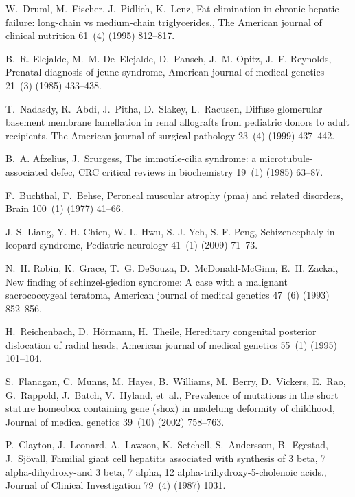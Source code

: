 \documentclass{article}
\theoremstyle{definition}
\begin{document}
\begin{thebibliography}{10}
W.~Druml, M.~Fischer, J.~Pidlich, K.~Lenz, Fat elimination in chronic hepatic
  failure: long-chain vs medium-chain triglycerides., The American journal of
  clinical nutrition 61~(4) (1995) 812--817.

B.~R. Elejalde, M.~M. De~Elejalde, D.~Pansch, J.~M. Opitz, J.~F. Reynolds,
  Prenatal diagnosis of jeune syndrome, American journal of medical genetics
  21~(3) (1985) 433--438.

T.~Nadasdy, R.~Abdi, J.~Pitha, D.~Slakey, L.~Racusen, Diffuse glomerular
  basement membrane lamellation in renal allografts from pediatric donors to
  adult recipients, The American journal of surgical pathology 23~(4) (1999)
  437--442.

B.~A. Afzelius, J.~Srurgess, The immotile-cilia syndrome: a
  microtubule-associated defec, CRC critical reviews in biochemistry 19~(1)
  (1985) 63--87.

F.~Buchthal, F.~Behse, Peroneal muscular atrophy (pma) and related disorders,
  Brain 100~(1) (1977) 41--66.

J.-S. Liang, Y.-H. Chien, W.-L. Hwu, S.-J. Yeh, S.-F. Peng, Schizencephaly in
  leopard syndrome, Pediatric neurology 41~(1) (2009) 71--73.

N.~H. Robin, K.~Grace, T.~G. DeSouza, D.~McDonald-McGinn, E.~H. Zackai, New
  finding of schinzel-giedion syndrome: A case with a malignant sacrococcygeal
  teratoma, American journal of medical genetics 47~(6) (1993) 852--856.

H.~Reichenbach, D.~H{\"o}rmann, H.~Theile, Hereditary congenital posterior
  dislocation of radial heads, American journal of medical genetics 55~(1)
  (1995) 101--104.

S.~Flanagan, C.~Munns, M.~Hayes, B.~Williams, M.~Berry, D.~Vickers, E.~Rao,
  G.~Rappold, J.~Batch, V.~Hyland, et~al., Prevalence of mutations in the short
  stature homeobox containing gene (shox) in madelung deformity of childhood,
  Journal of medical genetics 39~(10) (2002) 758--763.

P.~Clayton, J.~Leonard, A.~Lawson, K.~Setchell, S.~Andersson, B.~Egestad,
  J.~Sj{\"o}vall, Familial giant cell hepatitis associated with synthesis of 3
  beta, 7 alpha-dihydroxy-and 3 beta, 7 alpha, 12 alpha-trihydroxy-5-cholenoic
  acids., Journal of Clinical Investigation 79~(4) (1987) 1031.


\end{thebibliography}
\end{document}
